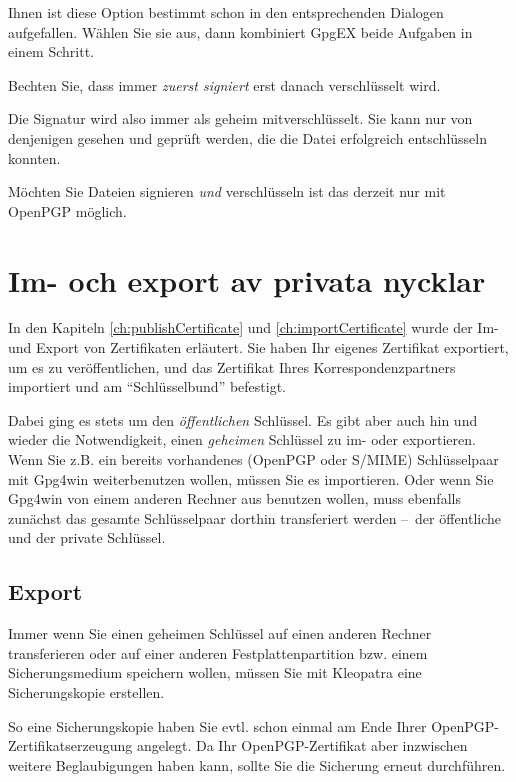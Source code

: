 \documentclass[a4paper,11pt, oneside,openright,titlepage,dvips]{scrbook}
\newcounter{part}
\newcounter{chapter}
\newcounter{section}[chapter]
\begin{document}
Ihnen ist diese Option bestimmt schon in den entsprechenden
Dialogen aufgefallen.
Wählen Sie sie aus, dann kombiniert GpgEX beide Aufgaben in einem
Schritt.

Bechten Sie, dass immer {\em zuerst signiert} erst danach verschlüsselt
wird.

Die Signatur wird also immer als geheim mitverschlüsselt.
Sie kann nur von denjenigen gesehen und geprüft werden,
die die Datei erfolgreich entschlüsseln konnten.

Möchten Sie Dateien signieren \textit{und} verschlüsseln ist das
derzeit nur mit OpenPGP möglich.



\clearpage
\chapter{Im- och export av privata nycklar}
\label{ch:ImExport}

In den Kapiteln \ref{ch:publishCertificate} und
\ref{ch:importCertificate}
wurde der Im- und Export von Zertifikaten erläutert. Sie haben
Ihr eigenes Zertifikat exportiert, um es zu veröffentlichen, 
und das Zertifikat Ihres Korrespondenzpartners importiert 
und am "`Schlüsselbund"' befestigt.

Dabei ging es stets um den \textit{öffentlichen} Schlüssel. Es gibt aber auch
hin und wieder die Notwendigkeit, einen \textit{geheimen} Schlüssel zu im- oder
exportieren. Wenn Sie z.B. ein bereits vorhandenes 
(OpenPGP oder S/MIME) Schlüsselpaar mit Gpg4win weiterbenutzen wollen,
müssen Sie es importieren. Oder wenn Sie Gpg4win von einem anderen Rechner aus
benutzen wollen, muss ebenfalls zunächst das gesamte Schlüsselpaar dorthin
transferiert werden --~der öffentliche und der private Schlüssel.


\clearpage
\section{Export}
Immer wenn Sie einen geheimen Schlüssel auf einen anderen Rechner
transferieren oder auf einer anderen Festplattenpartition bzw. einem
Sicherungsmedium speichern wollen, müssen Sie mit Kleopatra eine
Sicherungskopie erstellen.

So eine Sicherungskopie haben Sie evtl. schon einmal am Ende Ihrer
OpenPGP-Zertifikatserzeugung angelegt. Da Ihr OpenPGP-Zertifikat aber inzwischen weitere
Beglaubigungen haben kann, sollte Sie die Sicherung erneut durchführen.
\end{document}
